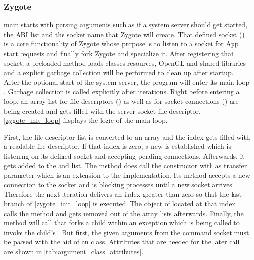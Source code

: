 \subsubsection{Zygote}\label{section:zygote}
 main starts with parsing arguments such as if a system
server should get started, the ABI list and the socket name that Zygote will
create. That defined socket () is a core functionality of Zygote whose purpose
is to listen to a socket for App start requests and finally fork Zygote and specialize it. After registering that socket, a preloaded method loads classes
resources, OpenGL and shared libraries and a explicit garbage collection
 will be performed to clean up after startup. After the optional start of the system server, the program will enter its main loop
. Garbage collection is called explicitly
after  iterations. Right before entering a loop, an array list for file descriptors () as well as for socket connections () are being
created and  gets filled with the server socket file descriptor.
\autoref{zygote_init_loop} displays the logic of the main loop.



First, the file descriptor list is converted to an array and the index gets
filled with a readable file descriptor. If that index is zero,
a new  is established which is listening
on its defined socket and accepting pending connections.
Afterwards, it gets added to the 
and  list.
The  method does
call the  constructor with 
as transfer parameter which is an extension to the 
implementation. Its  method accepts a new connection
to the socket and is blocking processes until a new socket arrives.
Therefore the next iteration delivers an index greater than zero so that
the last  branch of \autoref{zygote_init_loop} is executed.
The  object of  located at that index calls
the  method and gets removed out of the array lists afterwards.
Finally, the  method will call 
that forks a child within an exception which is being called to invoke the child's .
But first, the given arguments from the command socket must be parsed with the
aid of an  class. Attributes that are needed for the later  call are shown in \autoref{tab:argument_class_attributes}.

